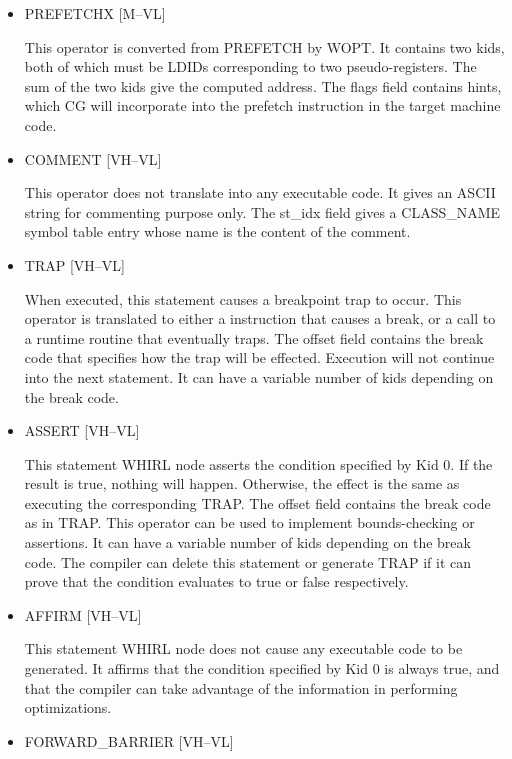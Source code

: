 \begin{itemize}
\item
{}%
PREFETCHX \hfill [M--VL]

This operator is converted from
%
PREFETCH by WOPT. It contains
two kids, both of which must be
%
LDIDs corresponding to two pseudo-registers. The sum of the two kids
give the computed address. The flags field contains hints, which
CG will incorporate into the prefetch instruction in the target
machine code.

\item
{}%
COMMENT \hfill [VH--VL]

This operator does not translate into any executable code. It gives
an ASCII string for commenting purpose only. The st\_idx field gives
a CLASS\_NAME symbol table entry whose name is the content of the comment.

\item
{}%
TRAP \hfill [VH--VL]

When executed, this statement causes a breakpoint trap to occur.
This operator is translated to either a instruction that causes
a break, or a call to a
runtime routine that eventually traps. The offset field contains
the break code that specifies how the trap will be effected. Execution
will not continue into the next statement. It can have a variable
number of kids depending on the break code.

\item
{}%
ASSERT \hfill [VH--VL]

This statement WHIRL node asserts the condition specified by Kid
0. If the result is true, nothing will happen. Otherwise, the effect
is the same as
executing the corresponding
%
TRAP. The offset field contains the
break code as in
%
TRAP. This operator can be used to implement bounds-checking or
assertions. It can have a variable number of kids depending on the
break code. The compiler can delete this statement or generate
%
TRAP
if it can prove that the condition evaluates to true or false
respectively.

\item
{}%
AFFIRM \hfill [VH--VL]

This statement WHIRL node does not cause any executable code to
be generated. It affirms that the condition specified by Kid 0 is
always true,
and that the compiler can take advantage of the information in
performing optimizations.

%
\item  FORWARD\_BARRIER \hfill [VH--VL]


\end{itemize}
